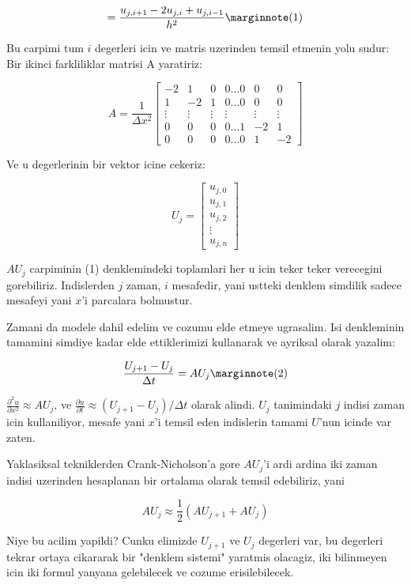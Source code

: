 \documentclass[12pt,fleqn]{article}\usepackage{../common}
\begin{document}
$$
= \frac{u_{j,i+1}-2u_{j,i}+u_{j,i-1}}{h^2} 
\mlabel{1}
$$

Bu carpimi tum $i$ degerleri icin ve matris uzerinden temsil etmenin yolu sudur:
Bir ikinci farkliliklar matrisi A yaratiriz:

$$ 
A = \frac{1}{\Delta x^2}
\left[ \begin{array}{ccccccc}
-2 & 1 & 0 & 0 \ldots 0 & 0 & 0 \\
1 & -2 & 1 & 0 \ldots 0 & 0 & 0 \\
\vdots & \vdots & \vdots & \vdots & \vdots & \vdots \\
0 & 0 & 0 & 0 \ldots 1 & -2 & 1 \\
0 & 0 & 0 & 0 \ldots 0 & 1 & -2
\end{array} \right]
 $$

Ve u degerlerinin bir vektor icine cekeriz:

$$ U_j =
\left[ \begin{array}{c}
u_{j,0} \\
u_{j,1} \\
u_{j,2} \\
\vdots \\
u_{j,n}
\end{array} \right]
 $$

$AU_j$ carpiminin (1) denklemindeki toplamlari her u icin teker teker
verecegini gorebiliriz. Indislerden $j$ zaman, $i$ mesafedir, yani ustteki
denklem simdilik sadece mesafeyi yani $x$'i parcalara bolmustur.

Zamani da modele dahil edelim ve cozumu elde etmeye ugrasalim. Isi
denkleminin tamamini simdiye kadar elde ettiklerimizi kullanarak ve
ayriksal olarak yazalim:

$$
\frac{U_{j+1}-U_j}{\Delta t} = AU_j 
\mlabel{2}
$$

$\frac{\partial^2u}{\partial x^2} \approx AU_j$, ve $\frac{\partial
  u}{\partial t} \approx (U_{j+1}-U_j) / \Delta t$ olarak
alindi. $U_j$ tanimindaki $j$ indisi zaman icin kullaniliyor, mesafe
yani $x$'i temsil eden indislerin tamami $U$'nun icinde var zaten.

Yaklasiksal tekniklerden Crank-Nicholson'a gore $AU_j$'i ardi ardina
iki zaman indisi uzerinden hesaplanan bir ortalama olarak temsil
edebiliriz, yani

$$ AU_j \approx \frac{1}{2}(AU_{j+1}+AU_j) $$

Niye bu acilim yapildi? Cunku elimizde $U_{j+1}$ ve $U_j$ degerleri var, bu
degerleri tekrar ortaya cikararak bir "denklem sistemi" yaratmis olacagiz, iki
bilinmeyen icin iki formul yanyana gelebilecek ve cozume erisilebilecek. 
\end{document}
